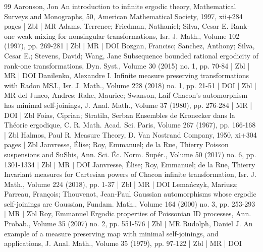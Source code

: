 \begin{thebibliography}{99}
Aaronson, Jon An introduction to infinite ergodic theory, Mathematical Surveys and Monographs, 50, American Mathematical Society, 1997, xii+284 pages | Zbl | MR
Adams, Terrence; Friedman, Nathaniel; Silva, Cesar E. Rank-one weak mixing for nonsingular transformations, Isr. J. Math., Volume 102 (1997), pp. 269-281 | Zbl | MR | DOI
Bozgan, Francisc; Sanchez, Anthony; Silva, Cesar E.; Stevens, David; Wang, Jane Subsequence bounded rational ergodicity of rank-one transformations, Dyn. Syst., Volume 30 (2015) no. 1, pp. 70-84 | Zbl | MR | DOI
Danilenko, Alexandre I. Infinite measure preserving transformations with Radon MSJ., Isr. J. Math., Volume 228 (2018) no. 1, pp. 21-51 | DOI | Zbl | MR
del Junco, Andres; Rahe, Maurice; Swanson, Laif Chacon’s automorphism has minimal self-joinings, J. Anal. Math., Volume 37 (1980), pp. 276-284 | MR | DOI | Zbl
Foias, Ciprian; Stratila, Serban Ensembles de Kronecker dans la Théorie ergodique, C. R. Math. Acad. Sci. Paris, Volume 267 (1967), pp. 166-168 | Zbl
Halmos, Paul R. Measure Theory, D. Van Nostrand Company, 1950, xi+304 pages | Zbl
Janvresse, Élise; Roy, Emmanuel; de la Rue, Thierry Poisson suspensions and SuShis, Ann. Sci. Éc. Norm. Supér., Volume 50 (2017) no. 6, pp. 1301-1334 | Zbl | MR | DOI
Janvresse, Élise; Roy, Emmanuel; de la Rue, Thierry Invariant measures for Cartesian powers of Chacon infinite transformation, Isr. J. Math., Volume 224 (2018), pp. 1-37 | Zbl | MR | DOI
Lemańczyk, Mariusz; Parreau, François; Thouvenot, Jean-Paul Gaussian automorphisms whose ergodic self-joinings are Gaussian, Fundam. Math., Volume 164 (2000) no. 3, pp. 253-293 | MR | Zbl
Roy, Emmanuel Ergodic properties of Poissonian ID processes, Ann. Probab., Volume 35 (2007) no. 2, pp. 551-576 | Zbl | MR
Rudolph, Daniel J. An example of a measure preserving map with minimal self-joinings, and applications, J. Anal. Math., Volume 35 (1979), pp. 97-122 | Zbl | MR | DOI
\end{thebibliography}
